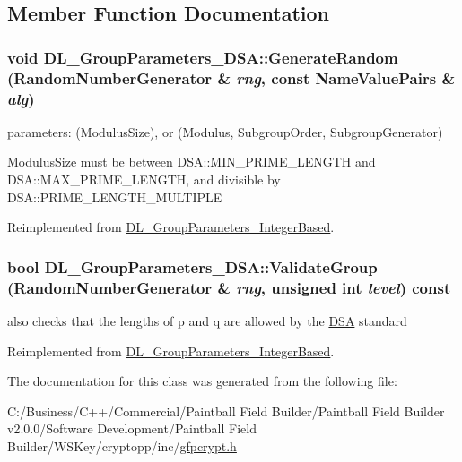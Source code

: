 \subsection{Member Function Documentation}
\hypertarget{class_d_l___group_parameters___d_s_a_ac83d3668c342b3a1fb367ed7785e27a3}{
\subsubsection[{GenerateRandom}]{\setlength{\rightskip}{0pt plus 5cm}void DL\_\-GroupParameters\_\-DSA::GenerateRandom ({\bf RandomNumberGenerator} \& {\em rng}, \/  const {\bf NameValuePairs} \& {\em alg})}}
\label{class_d_l___group_parameters___d_s_a_ac83d3668c342b3a1fb367ed7785e27a3}
parameters: (ModulusSize), or (Modulus, SubgroupOrder, SubgroupGenerator)

ModulusSize must be between DSA::MIN\_\-PRIME\_\-LENGTH and DSA::MAX\_\-PRIME\_\-LENGTH, and divisible by DSA::PRIME\_\-LENGTH\_\-MULTIPLE 

Reimplemented from \hyperlink{class_d_l___group_parameters___integer_based_a8c9a79c493a215ca37408bb7ddfb5533}{DL\_\-GroupParameters\_\-IntegerBased}.\hypertarget{class_d_l___group_parameters___d_s_a_a1161018a8f95f1ac818272c571a52775}{
\subsubsection[{ValidateGroup}]{\setlength{\rightskip}{0pt plus 5cm}bool DL\_\-GroupParameters\_\-DSA::ValidateGroup ({\bf RandomNumberGenerator} \& {\em rng}, \/  unsigned int {\em level}) const}}
\label{class_d_l___group_parameters___d_s_a_a1161018a8f95f1ac818272c571a52775}
also checks that the lengths of p and q are allowed by the \hyperlink{struct_d_s_a}{DSA} standard 

Reimplemented from \hyperlink{class_d_l___group_parameters___integer_based}{DL\_\-GroupParameters\_\-IntegerBased}.

The documentation for this class was generated from the following file:\begin{DoxyCompactItemize}
\item 
C:/Business/C++/Commercial/Paintball Field Builder/Paintball Field Builder v2.0.0/Software Development/Paintball Field Builder/WSKey/cryptopp/inc/\hyperlink{gfpcrypt_8h}{gfpcrypt.h}\end{DoxyCompactItemize}
